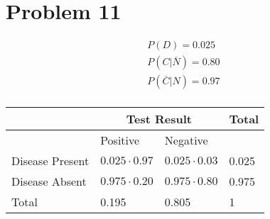 \documentclass{article}
\begin{document}
\pagebreak

\section*{Problem 11}
\begin{align*}
    P(D) = 0.025                    \\
    P(C \vert\overline{N}) = 0.80   \\
    P(\overline{C} \vert N) = 0.97\ \\
\end{align*}

\begin{center}
    \begin{tabular}{|l|l|l|l|}
        \hline
                        & \multicolumn{2}{c|}{Test Result} & Total                        \\
        \hline
                        & Positive                         & Negative             &       \\
        \hline
        Disease Present & \(0.025 \cdot 0.97\)             & \(0.025 \cdot 0.03\) & 0.025 \\
        \hline
        Disease Absent  & \(0.975 \cdot 0.20\)             & \(0.975 \cdot 0.80\) & 0.975 \\
        \hline
        Total           & 0.195                            & 0.805                & 1     \\
        \hline
    \end{tabular}
\end{center}
\end{document}
